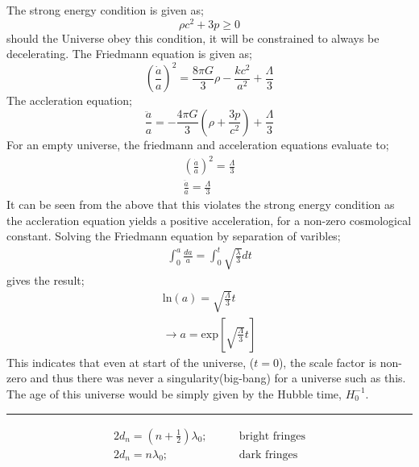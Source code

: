 \documentclass[11pt, a4paper, answers]{exam}
\begin{document}
\begin{questions}
    \begin{solution}
        The strong energy condition is given as;
        \begin{equation*}
            \rho c^2 + 3p \ge 0
        \end{equation*}
        should the Universe obey this condition, it will be constrained to always be decelerating.
        The Friedmann equation is given as;
        \begin{equation*}
            \left(\frac{\dot{a}}{a}\right)^2 = \frac{8\pi G}{3}\rho - \frac{kc^2}{a^2} + \frac{\Lambda}{3}
        \end{equation*}
        The accleration equation;
        \begin{equation*}
            \frac{\ddot{a}}{a} = -\frac{4\pi G }{3}\left(\rho+ \frac{3p}{c^2}\right) + \frac{\Lambda}{3}
        \end{equation*}
        For an empty universe, the friedmann and acceleration equations evaluate to;
        \begin{align*}
            \left(\frac{\dot{a}}{a}\right)^2 = \frac{\Lambda}{3} \\
            \frac{\ddot{a}}{a} = \frac{\Lambda}{3}
        \end{align*}
        It can be seen from the above that this violates the strong energy condition as the
        accleration equation yields a positive acceleration, for a non-zero cosmological constant.
        Solving the Friedmann equation by separation of varibles;
        \begin{align*}
            \int^a_0\frac{da}{a} = \int^t_0\sqrt{\frac{\lambda}{3}}dt
        \end{align*}
        gives the result;
        \begin{align*}
            \text{ln}(a) = \sqrt{\frac{\Lambda}{3}}t \\
            \to a = \text{exp}\left[\sqrt{\frac{\Lambda}{3}}t\right]
        \end{align*}
        This indicates that even at start of the universe, ($t = 0$), the scale factor is non-zero
        and thus there was never a singularity(big-bang) for a universe such as this.
        The age of this universe would be simply given by the Hubble time, $H_0^{-1}$.
    \end{solution}
    \begin{center}
        \rule{8cm}{0.4pt}
    \end{center}
    \newpage


    \begin{align*}
        2d_n = (n+\frac{1}{2})\lambda_0; & \qquad{\text{bright fringes}} \\
        2d_n = n\lambda_0;               & \qquad{\text{dark fringes}}
    \end{align*}


\end{questions}
\end{document}
